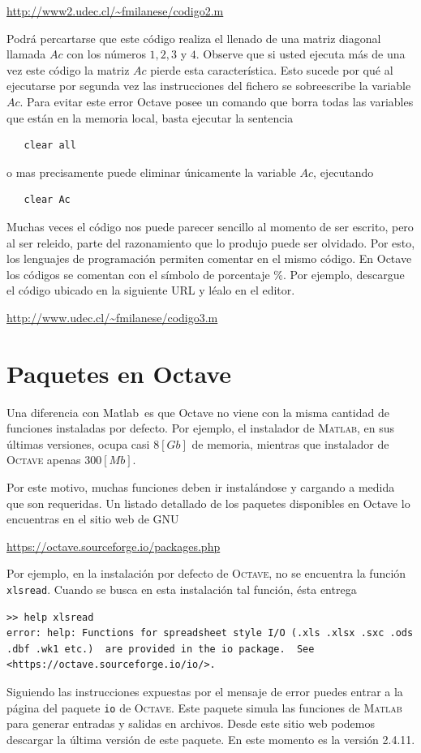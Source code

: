 \documentclass[letter,11pt]{article}
\newcommand\0{\mathbf{0}}
\newcommand{\matlab}{{\sc Matlab}}
\newcommand{\octave}{{\sc Octave }}
\begin{document}
\url{http://www2.udec.cl/~fmilanese/codigo2.m}
  
Podr\'a percartarse que este c\'odigo realiza el llenado de una matriz diagonal llamada $Ac$ con los n\'umeros $1,2,3$ y $4$. Observe que si usted ejecuta m\'as de una vez este c\'odigo la matriz $Ac$ pierde  esta caracter\'istica. Esto sucede por qu\'e al ejecutarse por segunda vez las instrucciones del fichero   se sobreescribe la variable $Ac$. Para evitar este error \octave posee un comando que borra todas las variables que est\'an en la memoria local, basta ejecutar la sentencia 
  \begin{lstlisting}
   clear all
  \end{lstlisting}
  o mas precisamente puede eliminar \'unicamente la variable $Ac$, ejecutando
  \begin{lstlisting}
   clear Ac
  \end{lstlisting}
  Muchas veces el c\'odigo nos puede parecer sencillo al momento de ser escrito, pero al ser releido, parte del razonamiento que lo produjo puede ser olvidado. Por esto, los lenguajes de programaci\'on permiten 
  comentar en el mismo c\'odigo. En \octave los c\'odigos se comentan con el s\'imbolo de porcentaje \%. Por ejemplo, 
  descargue el c\'odigo ubicado en la siguiente URL y l\'ealo en el editor.
\begin{center}
\url{ http://www.udec.cl/~fmilanese/codigo3.m}
\end{center}

\section{Paquetes en \octave}

Una diferencia con \matlab\, es que \octave no viene con la misma cantidad de funciones instaladas por defecto. Por ejemplo, el instalador de \textsc{Matlab}, en sus \'ultimas versiones, ocupa casi $8[Gb]$ de memoria, mientras que instalador de \textsc{Octave} apenas $300[Mb]$.

Por este motivo, muchas funciones deben ir instal\'andose y cargando a medida que son requeridas. Un listado detallado de los paquetes disponibles en \octave lo encuentras en el sitio web de GNU
\begin{center}
\url{https://octave.sourceforge.io/packages.php}
\end{center}
Por ejemplo, en la instalaci\'on por defecto de \textsc{Octave}, no se encuentra la funci\'on \texttt{xlsread}. Cuando se busca en esta instalaci\'on tal funci\'on, \'esta entrega
\begin{lstlisting}
>> help xlsread
error: help: Functions for spreadsheet style I/O (.xls .xlsx .sxc .ods .dbf .wk1 etc.)  are provided in the io package.  See <https://octave.sourceforge.io/io/>.
\end{lstlisting}
Siguiendo las instrucciones expuestas por el mensaje de error puedes entrar a la p\'agina del paquete \texttt{io} de \textsc{Octave}. Este paquete simula las funciones de \textsc{Matlab} para generar entradas y salidas en archivos. Desde este sitio web podemos descargar la \'ultima versi\'on de este paquete. En este momento es la versi\'on 2.4.11.
\end{document}
